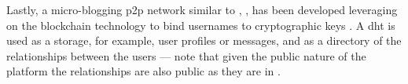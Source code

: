 Lastly, a micro-blogging \ac{p2p} network similar to \Twitter, \Twister, has been 
developed leveraging on the blockchain technology to bind usernames to cryptographic 
keys \cite{Twister}. A \ac{dht} is used as a storage, for example, user profiles 
or messages, and as a directory of the relationships between the users --- note 
that given the public nature of the platform the relationships are also public as 
they are in \Twitter.

%


